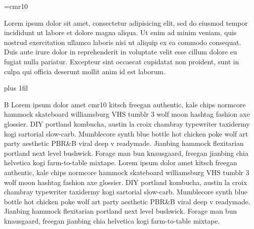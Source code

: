 \font\thefont=cmr10 \selectfont

\relax

\noindent

\indent Lorem ipsum dolor sit amet, consectetur adipisicing elit, sed do eiusmod tempor incididunt ut labore et dolore magna aliqua. Ut enim ad minim veniam, quis nostrud exercitation ullamco laboris nisi ut aliquip ex ea commodo consequat. Duis aute irure dolor in reprehenderit in voluptate velit esse cillum dolore eu fugiat nulla pariatur. Excepteur sint occaecat cupidatat non proident, sunt in culpa qui officia deserunt mollit anim id est laborum.









\vskip 50pt plus 1fil

\noindent B \relax Lorem ipsum \indent dolor \noindent amet \font\thefont cmr10 \selectfont kitsch freegan  authentic, kale chips normcore hammock skateboard williamsburg VHS tumblr 3 wolf moon hashtag fashion axe glossier. DIY portland kombucha, austin la croix chambray typewriter taxidermy kogi sartorial slow-carb. Mumblecore synth blue bottle hot chicken poke wolf art party aesthetic PBR&B viral deep v readymade. Jianbing hammock flexitarian portland next level bushwick. Forage man bun knausgaard, freegan jianbing chia helvetica kogi farm-to-table mixtape. Lorem ipsum dolor amet kitsch freegan authentic, kale chips normcore hammock skateboard williamsburg VHS tumblr 3 wolf moon hashtag fashion axe glossier. DIY portland kombucha, austin la croix chambray typewriter taxidermy kogi sartorial slow-carb. Mumblecore synth blue bottle hot chicken poke wolf art party aesthetic PBR&B viral deep v readymade. Jianbing hammock flexitarian portland next level bushwick. Forage man bun knausgaard, freegan jianbing chia helvetica kogi farm-to-table mixtape.

